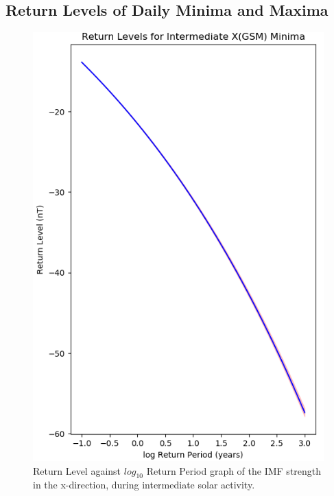 \documentclass[11pt]{article}
\begin{document}
    \subsection{Return Levels of Daily Minima and Maxima}\label{sec:returnperiod}
        \begin{figure}[t!]
            \begin{minipage}{0.48\textwidth}
                \centering
                \includegraphics[width=\textwidth]{fig_method/MFIintXminReturn.png}
                \caption{Return Level against $log_{10}$ Return Period graph of the IMF strength in the x-direction, during intermediate solar activity.}
                \label{fig:MFIintXminReturn}
            \end{minipage}
            \hfill
            \begin{minipage}{0.48\textwidth}

\end{minipage}
\end{figure}
\end{document}
